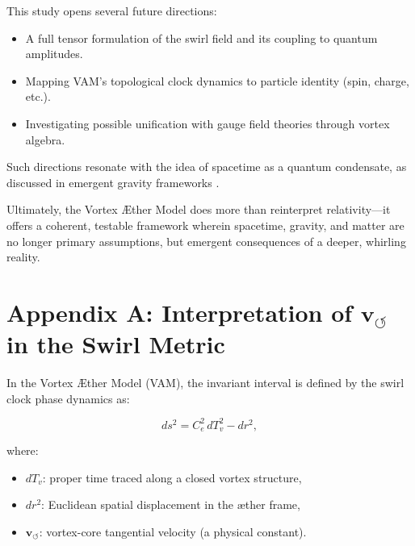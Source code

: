 \documentclass[12pt]{article}
\begin{document}
    This study opens several future directions:

    \begin{itemize}
        \item A full tensor formulation of the swirl field and its coupling to quantum amplitudes.
        \item Mapping VAM’s topological clock dynamics to particle identity (spin, charge, etc.).
        \item Investigating possible unification with gauge field theories through vortex algebra.
    \end{itemize}

Such directions resonate with the idea of spacetime as a quantum condensate, as discussed in emergent gravity frameworks \cite{hu2005condensate}.

    Ultimately, the Vortex Æther Model does more than reinterpret relativity—it offers a coherent, testable framework wherein spacetime, gravity, and matter are no longer primary assumptions, but emergent consequences of a deeper, whirling reality.




\appendix
    \section*{Appendix A: Interpretation of \( \mathbf{v}_{\scriptscriptstyle\boldsymbol{\circlearrowleft}} \) in the Swirl Metric}\label{sec:interpretation_c_e}

    In the Vortex \AE{}ther Model (VAM), the invariant interval is defined by the swirl clock phase dynamics as:

    \[
        ds^2 = C_e^2\, dT_v^2 - dr^2,
    \]

    where:
    \begin{itemize}
        \item \( dT_v \): proper time traced along a closed vortex structure,
        \item \( dr^2 \): Euclidean spatial displacement in the æther frame,
        \item \( \mathbf{v}_{\scriptscriptstyle\boldsymbol{\circlearrowleft}} \): vortex-core tangential velocity (a physical constant).
    \end{itemize}
\end{document}
